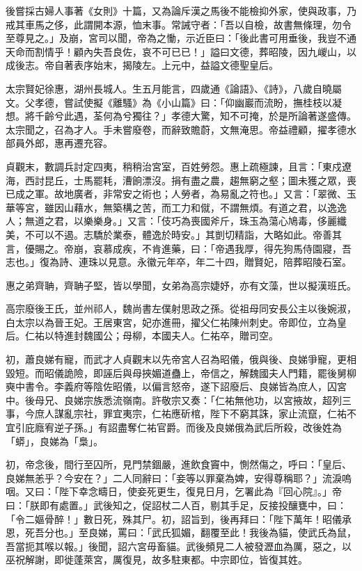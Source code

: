 \begin{pinyinscope}
 後嘗採古婦人事著《女則》十篇，又為論斥漢之馬後不能檢抑外家，使與政事，乃戒其車馬之侈，此謂開本源，恤末事。常誡守者：「吾以自檢，故書無條理，勿令至尊見之。」及崩，宮司以聞，帝為之慟，示近臣曰：「後此書可用垂後，我豈不通天命而割情乎！顧內失吾良佐，哀不可已已！」謚曰文德，葬昭陵，因九嵕山，以成後志。帝自著表序始末，揭陵左。上元中，益謚文德聖皇后。



 太宗賢妃徐惠，湖州長城人。生五月能言，四歲通《論語》、《詩》，八歲自曉屬文。父孝德，嘗試使擬《離騷》為《小山篇》曰：「仰幽巖而流盼，撫桂枝以凝想。將千齡兮此遇，荃何為兮獨往？」孝德大驚，知不可掩，於是所論著遂盛傳。太宗聞之，召為才人。手未嘗廢卷，而辭致贍蔚，文無淹思。帝益禮顧，擢孝德水部員外郎，惠再遷充容。



 貞觀末，數調兵討定四夷，稍稍治宮室，百姓勞怨。惠上疏極諫，且言：「東戍遼海，西討昆丘，士馬罷耗，漕餉漂沒。捐有盡之農，趨無窮之壑；圖未獲之眾，喪已成之軍。故地廣者，非常安之術也；人勞者，為易亂之符也。」又言：「翠微、玉華等宮，雖因山藉水，無築構之苦，而工力和僦，不謂無煩。有道之君，以逸逸人；無道之君，以樂樂身。」又言：「伎巧為喪國斧斤，珠玉為蕩心鳩毒，侈麗纖美，不可以不遏。志驕於業泰，體逸於時安。」其剴切精詣，大略如此。帝善其言，優賜之。帝崩，哀慕成疾，不肯進藥，曰：「帝遇我厚，得先狗馬侍園寢，吾志也。」復為詩、連珠以見意。永徽元年卒，年二十四，贈賢妃，陪葬昭陵石室。



 惠之弟齊聃，齊聃子堅，皆以學聞，女弟為高宗婕妤，亦有文藻，世以擬漢班氏。



 高宗廢後王氏，並州祁人，魏尚書左僕射思政之孫。從祖母同安長公主以後婉淑，白太宗以為晉王妃。王居東宮，妃亦進冊，擢父仁祐陳州刺史。帝即位，立為皇后。仁祐以特進封魏國公；母柳，本國夫人。仁祐卒，贈司空。



 初，蕭良娣有寵，而武才人貞觀末以先帝宮人召為昭儀，俄與後、良娣爭寵，更相毀短。而昭儀詭險，即誣后與母挾媚道蠱上，帝信之，解魏國夫人門籍，罷後舅柳奭中書令。李義府等陰佐昭儀，以偏言怒帝，遂下詔廢后、良娣皆為庶人，囚宮中。後母兄、良娣宗族悉流嶺南。許敬宗又奏：「仁祐無他功，以宮掖故，超列三事，今庶人謀亂宗社，罪宜夷宗，仁祐應斫棺，陛下不窮其誅，家止流竄，仁祐不宜引庇廕宥逆子孫。」有詔盡奪仁祐官爵。而後及良娣俄為武后所殺，改後姓為「蟒」，良娣為「梟」。



 初，帝念後，間行至囚所，見門禁錮嚴，進飲食竇中，惻然傷之，呼曰：「皇后、良娣無恙乎？今安在？」二人同辭曰：「妾等以罪棄為婢，安得尊稱耶？」流淚嗚咽。又曰：「陛下幸念疇日，使妾死更生，復見日月，乞署此為『回心院』。」帝曰：「朕即有處置。」武後知之，促詔杖二人百，剔其手足，反接投釀甕中，曰：「令二嫗骨醉！」數日死，殊其尸。初，詔旨到，後再拜曰：「陛下萬年！昭儀承恩，死吾分也。」至良娣，罵曰：「武氏狐媚，翻覆至此！我後為貓，使武氏為鼠，吾當扼其喉以報。」後聞，詔六宮毋畜貓。武後頻見二人被發瀝血為厲，惡之，以巫祝解謝，即徙蓬萊宮，厲復見，故多駐東都。中宗即位，皆復其姓。




\end{pinyinscope}
